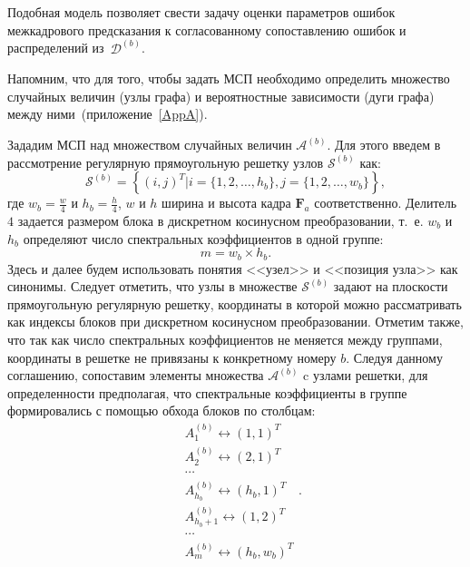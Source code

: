 Подобная модель позволяет свести задачу оценки параметров ошибок межкадрового предсказания к согласованному сопоставлению ошибок и распределений из~$\mathcal{D}^{(b)}$.

Напомним, что для того, чтобы задать МСП необходимо определить множество случайных величин (узлы графа) и вероятностные зависимости (дуги графа) между ними~(приложение~\ref{AppA}). 

Зададим МСП над множеством случайных величин $\mathcal{A}^{(b)}$. Для этого введем в рассмотрение регулярную прямоугольную решетку узлов $\mathcal{S}^{(b)}$ как:
\begin{equation*}
\mathcal{S}^{(b)} = \left\lbrace (i,j)^T \vert i=\{1,2,\ldots,h_{b}\}, j=\{1,2,\ldots,w_{b}\} \right\rbrace,
\end{equation*}
где $w_{b}=\frac{w}{4}$ и $h_{b}=\frac{h}{4}$, $w$ и $h$ ширина и высота кадра $\mathbf{F}_a$ соответственно. Делитель $4$ задается размером блока в  дискретном косинусном преобразовании, т.~е. $w_{b}$ и $h_{b}$ определяют число спектральных коэффициентов в одной группе:
\begin{equation*}
m=w_{b}\times h_{b}.
\end{equation*}
Здесь и далее будем использовать понятия <<узел>> и <<позиция узла>> как синонимы. Следует отметить, что узлы в множестве $\mathcal{S}^{(b)}$ задают на плоскости прямоугольную регулярную решетку, координаты в которой можно рассматривать как индексы блоков при дискретном косинусном преобразовании. Отметим также, что так как число спектральных коэффициентов не меняется между группами, координаты в решетке не привязаны к конкретному номеру $b$. Следуя данному соглашению, сопоставим элементы множества $\mathcal{A}^{(b)}$ c узлами решетки, для определенности предполагая, что спектральные коэффициенты в группе формировались с помощью обхода блоков по столбцам:
\begin{equation}
\begin{split}
& A_1^{(b)} \leftrightarrow (1,1)^T \\
& A_2^{(b)} \leftrightarrow (2,1)^T \\
& \cdots \\
& A_{h_{b}}^{(b)} \leftrightarrow (h_{b},1)^T \\
& A_{h_{b}+1}^{(b)} \leftrightarrow (1,2)^T \\
& \cdots \\
& A_m^{(b)} \leftrightarrow (h_{b},w_{b})^T
\end{split}.
\label{eq:MappingGridToVec}
\end{equation}

